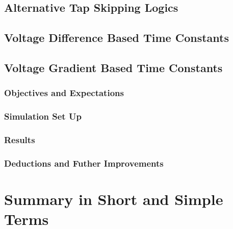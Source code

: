 \subsection{Alternative Tap Skipping Logics}

\subsection{Voltage Difference Based Time Constants}

\subsection{Voltage Gradient Based Time Constants}



\subsubsection{Objectives and Expectations}

\subsubsection{Simulation Set Up}

\subsubsection{Results}

\subsubsection{Deductions and Futher Improvements}






\section{Summary in Short and Simple Terms}